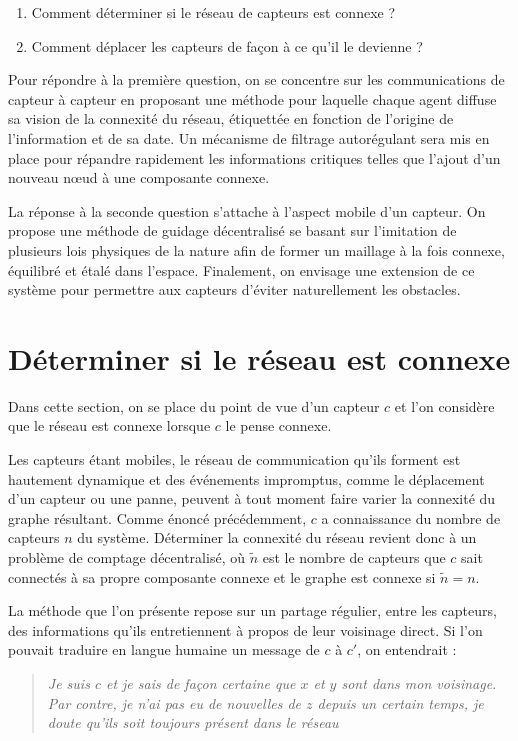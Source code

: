\documentclass[10pt]{article}
\begin{document}
\begin{multicols}{2}
\begin{enumerate}
\item{Comment déterminer si le réseau de capteurs est connexe ?}
\item{Comment déplacer les capteurs de façon à ce qu'il le devienne ?}
\end{enumerate}

Pour répondre à la première question, on se concentre sur les
communications de capteur à capteur en proposant une méthode pour
laquelle chaque agent diffuse sa vision de la connexité du réseau,
étiquettée en fonction de l'origine de l'information et de sa date. Un
mécanisme de filtrage autorégulant sera mis en place pour répandre
rapidement les informations critiques telles que l'ajout d'un nouveau
n\oe ud à une composante connexe.

La réponse à la seconde question s'attache à l'aspect mobile d'un
capteur. On propose une méthode de guidage décentralisé se basant sur
l'imitation de plusieurs lois physiques de la nature afin de former un
maillage à la fois connexe, équilibré et étalé dans
l'espace. Finalement, on envisage une extension de ce système pour
permettre aux capteurs d'éviter naturellement les obstacles.

\section{Déterminer si le réseau est connexe}

Dans cette section, on se place du point de vue d'un capteur $c$ et
l'on considère que le réseau est connexe lorsque $c$ le pense connexe.

Les capteurs étant mobiles, le réseau de communication qu'ils forment
est hautement dynamique et des événements impromptus, comme le
déplacement d'un capteur ou une panne, peuvent à tout moment faire
varier la connexité du graphe résultant. Comme énoncé précédemment,
$c$ a connaissance du nombre de capteurs $n$ du système. Déterminer la
connexité du réseau revient donc à un problème de comptage
décentralisé, o\`u $\tilde{n}$ est le nombre de capteurs que $c$ sait
connectés à sa propre composante connexe et le graphe est connexe si
$\tilde{n} = n$.

La méthode que l'on présente repose sur un partage régulier, entre les
capteurs, des informations qu'ils entretiennent à propos de leur
voisinage direct. Si l'on pouvait traduire en langue humaine un
message de $c$ à $c'$, on entendrait :

\begin{quote}
  \textit{Je suis $c$ et je sais de façon certaine que $x$ et $y$ sont
    dans mon voisinage. Par contre, je n'ai pas eu de nouvelles de $z$
    depuis un certain temps, je doute qu'ils soit toujours présent
    dans le réseau}
\end{quote}


\end{multicols}
\end{document}

